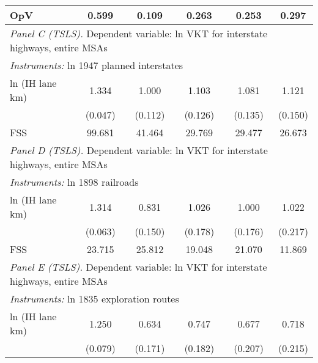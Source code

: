 \begin{table}[htbp]
\begin{tabular}{l*{5}{c}}
OpV                 &       0.599         &       0.109         &       0.263         &       0.253         &       0.297         \\
 
          \hline         
 \multicolumn{5}{l}{ \emph{Panel C (TSLS).} Dependent variable: ln VKT for interstate highways, entire MSAs} \\ 
 \multicolumn{5}{l}{ \emph{Instruments:} ln 1947 planned interstates} \\
ln (IH lane km)     &       1.334\sym{***}&       1.000\sym{***}&       1.103\sym{***}&       1.081\sym{***}&       1.121\sym{***}\\
                    &     (0.047)         &     (0.112)         &     (0.126)         &     (0.135)         &     (0.150)         \\
 
FSS                 &      99.681         &      41.464         &      29.769         &      29.477         &      26.673         \\
 
          \hline         
 \multicolumn{5}{l}{ \emph{Panel D (TSLS).} Dependent variable: ln VKT for interstate highways, entire MSAs} \\ 
 \multicolumn{5}{l}{ \emph{Instruments:} ln 1898 railroads} \\
ln (IH lane km)     &       1.314\sym{***}&       0.831\sym{***}&       1.026\sym{***}&       1.000\sym{***}&       1.022\sym{***}\\
                    &     (0.063)         &     (0.150)         &     (0.178)         &     (0.176)         &     (0.217)         \\
 
FSS                 &      23.715         &      25.812         &      19.048         &      21.070         &      11.869         \\
 
          \hline         
 \multicolumn{5}{l}{ \emph{Panel E (TSLS).} Dependent variable: ln VKT for interstate highways, entire MSAs} \\ 
 \multicolumn{5}{l}{ \emph{Instruments:} ln 1835 exploration routes} \\
ln (IH lane km)     &       1.250\sym{***}&       0.634\sym{***}&       0.747\sym{***}&       0.677\sym{**} &       0.718\sym{***}\\
                    &     (0.079)         &     (0.171)         &     (0.182)         &     (0.207)         &     (0.215)         \\
 

\end{tabular}
\end{table}
